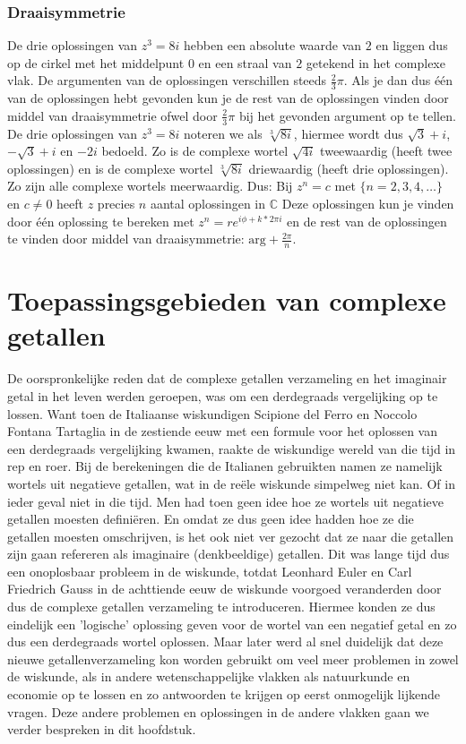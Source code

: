\documentclass[11pt,fleqn]{book} %
\begin{document}
\subsection{Draaisymmetrie}
De drie oplossingen van $z^3=8i$ hebben een absolute waarde van $2$ en liggen dus op de cirkel met het middelpunt $0$ en een straal van $2$ getekend in het complexe vlak. De argumenten van de oplossingen verschillen steeds $\frac{2}{3}\pi$. Als je dan dus één van de oplossingen hebt gevonden kun je de rest van de oplossingen vinden door middel van draaisymmetrie ofwel door $\frac{2}{3}\pi$ bij het gevonden argument op te tellen. De drie oplossingen van $z^3=8i$ noteren we als $\sqrt[3]{8i}$, hiermee wordt dus $\sqrt{3}+i$, $-\sqrt{3}+i$ en $-2i$ bedoeld.
Zo is de complexe wortel $\sqrt{4i}$ tweewaardig (heeft twee oplossingen) en is de complexe wortel $\sqrt[3]{8i}$ driewaardig (heeft drie oplossingen). Zo zijn alle complexe wortels meerwaardig. Dus:
Bij $z^n=c$ met $\{n=2, 3, 4, \ldots\}$ en $c\neq 0$ heeft $z$ precies $n$ aantal oplossingen in $\mathbb{C}$
Deze oplossingen kun je vinden door één oplossing te bereken met $z^n=re^{i\phi+k*2\pi i}$ en de rest van de oplossingen te vinden door middel van draaisymmetrie: $\text{arg}+\frac{2\pi}{n}$.


\chapter{Toepassingsgebieden van complexe getallen}
De oorspronkelijke reden dat de complexe getallen verzameling en het imaginair getal in het leven werden geroepen, was om een derdegraads vergelijking op te lossen. Want toen de Italiaanse wiskundigen Scipione del Ferro en Noccolo Fontana Tartaglia in de zestiende eeuw met een formule voor het oplossen van een derdegraads vergelijking kwamen, raakte de wiskundige wereld van die tijd in rep en roer. Bij de berekeningen die de Italianen gebruikten namen ze namelijk wortels uit negatieve getallen, wat in de reële wiskunde simpelweg niet kan. Of in ieder geval niet in die tijd. Men had toen geen idee hoe ze wortels uit negatieve getallen moesten definiëren. En omdat ze dus geen idee hadden hoe ze die getallen moesten omschrijven, is het ook niet ver gezocht dat ze naar die getallen zijn gaan refereren als imaginaire (denkbeeldige) getallen.
Dit was lange tijd dus een onoplosbaar probleem in de wiskunde, totdat Leonhard Euler en Carl Friedrich Gauss in de achttiende eeuw de wiskunde voorgoed veranderden door dus de complexe getallen verzameling te introduceren. Hiermee konden ze dus eindelijk een 'logische' oplossing geven voor de wortel van een negatief getal en zo dus een derdegraads wortel oplossen. 
Maar later werd al snel duidelijk dat deze nieuwe getallenverzameling kon worden gebruikt om veel meer problemen in zowel de wiskunde, als in andere wetenschappelijke vlakken als natuurkunde en economie op te lossen en zo antwoorden te krijgen op eerst onmogelijk lijkende vragen. Deze andere problemen en oplossingen in de andere vlakken gaan we verder bespreken in dit hoofdstuk.
\end{document}
